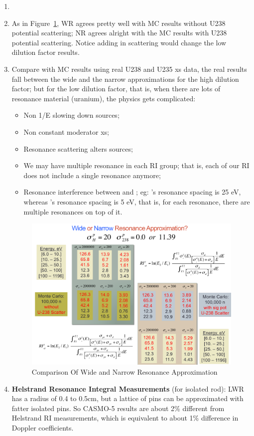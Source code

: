 \documentclass{school-22.211-notes}
\begin{document}
\begin{enumerate}
\item {} 

\item As in Figure~\ref{wide-vs-narrow}, WR agrees pretty well with MC results without U238 potential scattering; NR agrees alright with the MC results with U238 potential scattering. Notice adding in scattering would change the low dilution factor results.

\item Compare with MC results using real U238 and U235 xs data, the real results fall between the wide and the narrow approximations for the high dilution factor; but for the low dilution factor, that is, when there are lots of resonance material (uranium), the physics gets complicated: 
\begin{itemize}
\item Non 1/E slowing down sources;
\item Non constant moderator xs;
\item Resonance scattering alters sources;
\item We may have multiple resonance in each RI group; that is, each of our RI does not include a single resonance anymore;
\item Resonance interference between  and ; eg: 's resonance spacing is 25 eV, whereas 's resonance spacing is 5 eV, that is, for each  resonance, there are multiple  resonances on top of it. 
\end{itemize}
\begin{figure}
  \centering
  \includegraphics[width=5in]{images/r-m/narrow-vs-wide-resonance.png}
  \caption{Comparison Of Wide and Narrow Resonance Approximation} \label{wide-vs-narrow}
\end{figure}
\item \textbf{Helstrand Resonance Integral Measurements} (for isolated rod): LWR has a radius of 0.4 to 0.5cm, but a lattice of pins can be approximated with fatter isolated pins. So CASMO-5 results are about 2\% different from Helstrand RI measurements, which is equivalent to about 1\% difference in Doppler coefficients. 
\end{enumerate}
\end{document}
